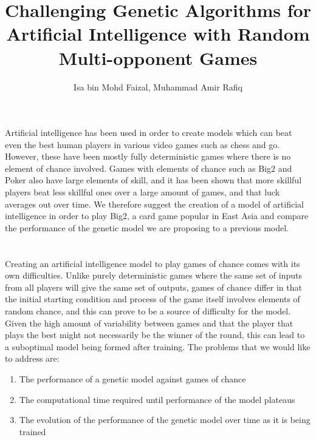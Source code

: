 \documentclass[]{article}
\title{Challenging Genetic Algorithms for Artificial Intelligence with Random Multi-opponent Games }
\author{Isa bin Mohd Faizal, Muhammad Amir Rafiq}
\begin{document}
\maketitle

\section*{}
Artificial intelligence has been used in order to create models which can beat even the best human players in various video games such as chess and go. However, these have been mostly fully deterministic games where there is no element of chance involved. Games with elements of chance such as Big2 and Poker also have large elements of skill, and it has been shown that more skillful players beat less skillful ones over a large amount of games, and that luck averages out over time. We therefore suggest the creation of a model of artificial intelligence in order to play Big2, a card game popular in East Asia and compare the performance of the genetic model we are proposing to a previous model.

\section*{}

Creating an artificial intelligence model to play games of chance comes with its own difficulties. Unlike purely deterministic games where the same set of inputs from all players will give the same set of outputs, games of chance differ in that the initial starting condition and process of the game itself involves elements of random chance, and this can prove to be a source of difficulty for the model. Given the high amount of variability between games and that the player that plays the best might not necessarily be the winner of the round, this can lead to a suboptimal model being formed after training. The problems that we would like to address are:

\begin{enumerate}
	\item The performance of a genetic model against games of chance
	\item The computational time required until performance of the model plateaus
	\item The evolution of the performance of the genetic model over time as it is being trained
\end{enumerate}
\end{document}
